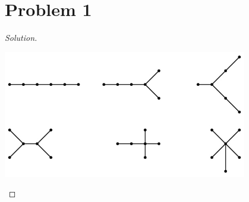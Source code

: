 \section*{Problem 1}
	\begin{proof} [Solution]
		\mbox{}\\
		\begin{center}
			\includegraphics[width=0.8\textwidth]{6_node.png}
		\end{center}
	\end{proof}
